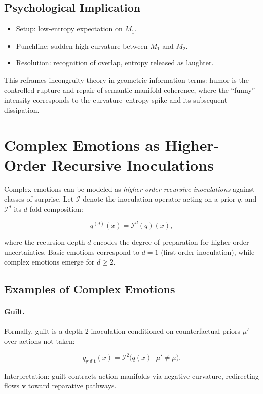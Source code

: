 \documentclass{article}
\theoremstyle{definition}
\begin{document}
\subsection{Psychological Implication}

\begin{itemize}
  \item Setup: low-entropy expectation on $M_1$.
  \item Punchline: sudden high curvature between $M_1$ and $M_2$.
  \item Resolution: recognition of overlap, entropy released as laughter.
\end{itemize}

This reframes incongruity theory in geometric-information terms: humor is the controlled rupture and repair 
of semantic manifold coherence, where the ``funny'' intensity corresponds to the curvature–entropy spike 
and its subsequent dissipation.

\section{Complex Emotions as Higher-Order Recursive Inoculations}

Complex emotions can be modeled as \emph{higher-order recursive inoculations} against classes of surprise. Let $\mathcal{I}$ denote the inoculation operator acting on a prior $q$, and $\mathcal{I}^d$ its $d$-fold composition:

\[
q^{(d)}(x) = \mathcal{I}^d(q)(x),
\]

where the recursion depth $d$ encodes the degree of preparation for 
higher-order uncertainties. Basic emotions correspond to $d=1$ 
(first-order inoculation), while complex emotions emerge for $d \geq 2$.

\subsection{Examples of Complex Emotions}

\paragraph{Guilt.}  
Formally, guilt is a depth-2 inoculation conditioned on 
counterfactual priors $\mu'$ over actions not taken:

\[
q_{\text{guilt}}(x) 
= \mathcal{I}^2 \big( q(x) \,\big|\, \mu' \neq \mu \big).
\]

Interpretation: guilt contracts action manifolds via negative curvature, 
redirecting flows $\mathbf{v}$ toward reparative pathways.
\end{document}
